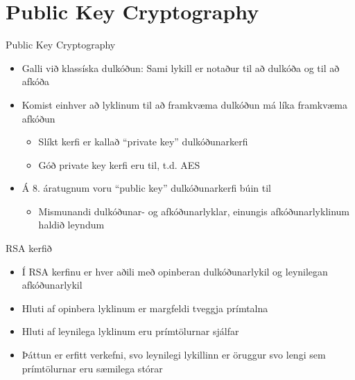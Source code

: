 \documentclass{beamer}
\begin{document}
\section{Public Key Cryptography}

\begin{frame}{Public Key Cryptography}
\begin{itemize}
 \item Galli við klassíska dulkóðun: Sami lykill er notaður til að dulkóða og til að afkóða
 \item Komist einhver að lyklinum til að framkvæma dulkóðun má líka framkvæma afkóðun
 \begin{itemize}
  \item Slíkt kerfi er kallað ``private key'' dulkóðunarkerfi
  \item Góð private key kerfi eru til, t.d. AES
 \end{itemize}
 \item Á 8. áratugnum voru ``public key'' dulkóðunarkerfi búin til
 \begin{itemize}
  \item Mismunandi dulkóðunar- og afkóðunarlyklar, einungis afkóðunarlyklinum haldið leyndum
 \end{itemize}
\end{itemize}
\end{frame}

\begin{frame}{RSA kerfið}
\begin{itemize}
 \item Í RSA kerfinu er hver aðili með opinberan dulkóðunarlykil og leynilegan afkóðunarlykil
 \item Hluti af opinbera lyklinum er margfeldi tveggja prímtalna
 \item Hluti af leynilega lyklinum eru prímtölurnar sjálfar
 \item Þáttun er erfitt verkefni, svo leynilegi lykillinn er öruggur svo lengi sem prímtölurnar eru sæmilega stórar
\end{itemize}
\end{frame}
\end{document}
